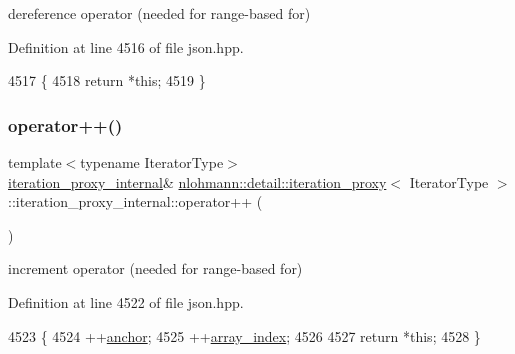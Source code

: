 dereference operator (needed for range-\/based for) 



Definition at line 4516 of file json.\+hpp.


\begin{DoxyCode}
4517         \{
4518             \textcolor{keywordflow}{return} *\textcolor{keyword}{this};
4519         \}
\end{DoxyCode}
\mbox{\label{classnlohmann_1_1detail_1_1iteration__proxy_1_1iteration__proxy__internal_a54a98e7cb1f015cc38dd69205f4651c0}} 
\subsubsection{\texorpdfstring{operator++()}{operator++()}}
{\footnotesize\ttfamily template$<$typename Iterator\+Type$>$ \\
\hyperlink{classnlohmann_1_1detail_1_1iteration__proxy_1_1iteration__proxy__internal}{iteration\+\_\+proxy\+\_\+internal}\& \hyperlink{classnlohmann_1_1detail_1_1iteration__proxy}{nlohmann\+::detail\+::iteration\+\_\+proxy}$<$ Iterator\+Type $>$\+::iteration\+\_\+proxy\+\_\+internal\+::operator++ (\begin{DoxyParamCaption}{ }\end{DoxyParamCaption})\hspace{0.3cm}{\ttfamily [inline]}}



increment operator (needed for range-\/based for) 



Definition at line 4522 of file json.\+hpp.


\begin{DoxyCode}
4523         \{
4524             ++\hyperlink{classnlohmann_1_1detail_1_1iteration__proxy_1_1iteration__proxy__internal_a994faf46a2f04ecb85d17b74641611a6}{anchor};
4525             ++\hyperlink{classnlohmann_1_1detail_1_1iteration__proxy_1_1iteration__proxy__internal_a3e9a5b1afe857cdf73bc1b31e9746273}{array\_index};
4526 
4527             \textcolor{keywordflow}{return} *\textcolor{keyword}{this};
4528         \}
\end{DoxyCode}
\mbox{\label{classnlohmann_1_1detail_1_1iteration__proxy_1_1iteration__proxy__internal_ae9fa7261205b9247c9d2d28d6b4ebd63}} 
